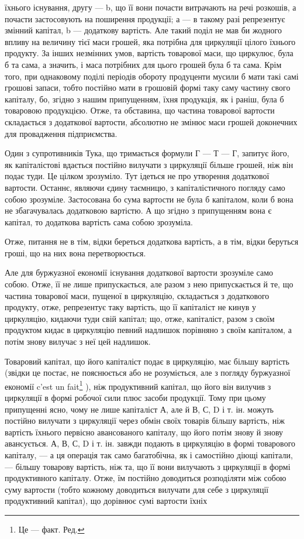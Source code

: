 \parcont{}  %
їхнього існування, другу — b, що її вони почасти витрачають на речі
розкошів, а почасти застосовують на поширення продукції; а — в такому
разі репрезентує змінний капітал, b — додаткову вартість. Але такий поділ
не мав би жодного впливу на величину тієї маси грошей, яка потрібна
для циркуляції цілого їхнього продукту. За інших незмінних умов, вартість
товарової маси, що циркулює, була б та сама, а значить, і маса
потрібних для цього грошей була б та сама. Крім того, при однаковому
поділі періодів обороту продуценти мусили б мати такі самі грошові запаси,
тобто постійно мати в грошовій формі таку саму частину свого
капіталу, бо, згідно з нашим припущенням, їхня продукція, як і раніш,
була б товаровою продукцією. Отже, та обставина, що частина товарової
вартости складається з додаткової вартости, абсолютно не змінює маси
грошей доконечних для провадження підприємства.

Один з супротивників Тука, що тримається формули Г — Т — Г, запитує
його, як капіталістові вдається постійно вилучати з циркуляції більше
грошей, ніж він подає туди. Це цілком зрозуміло. Тут ідеться не про
утворення додаткової вартости. Останнє, являючи єдину таємницю, з
капіталістичного погляду само собою зрозуміле. Застосована бо сума вартости
не була б капіталом, коли б вона не збагачувалась додатковою
вартістю. А що згідно з припущенням вона є капітал, то додаткова вартість
сама собою зрозуміла.

Отже, питання не в тім, відки береться додаткова вартість, а в тім,
відки беруться гроші, що на них вона перетворюється.

Але для буржуазної економії існування додаткової вартости зрозуміле
само собою. Отже, її не лише припускається, але разом з нею припускається
й те, що частина товарової маси, пущеної в циркуляцію, складається
з додаткового продукту, отже, репрезентує таку вартість, що її капіталіст
не кинув у циркуляцію, кидаючи туди свій капітал; що, отже, капіталіст,
разом з своїм продуктом кидає в циркуляцію певний надлишок
порівняно з своїм капіталом, а потім знову вилучає з неї цей надлишок.

Товаровий капітал, що його капіталіст подає в циркуляцію, має більшу
вартість (звідки це постає, не пояснюється або не розуміється, але з
погляду буржуазної економії c’est un fait\footnote*{
Це — факт. Ред.
} ), ніж продуктивний капітал,
що його він вилучив з циркуляції в формі робочої сили плюс засоби
продукції. Тому при цьому припущенні ясно, чому не лише капіталіст
А, але й В, С, D і т. ін. можуть постійно вилучати з циркуляції через
обмін своїх товарів більшу вартість, ніж вартість їхнього первісно авансованого
капіталу, що його потім знову й знову авансується. А, В, С,
D і т. ін. завжди подають в циркуляцію в формі товарового капіталу, —
а ця операція так само багатобічна, як і самостійно діющі капітали, —
більшу товарову вартість, ніж та, що її вони вилучають з циркуляції в
формі продуктивного капіталу. Отже, їм постійно доводиться розподіляти
між собою суму вартости (тобто кожному доводиться вилучати для себе
з циркуляції продуктивний капітал), що дорівнює сумі вартости їхніх
\parbreak{}  %
